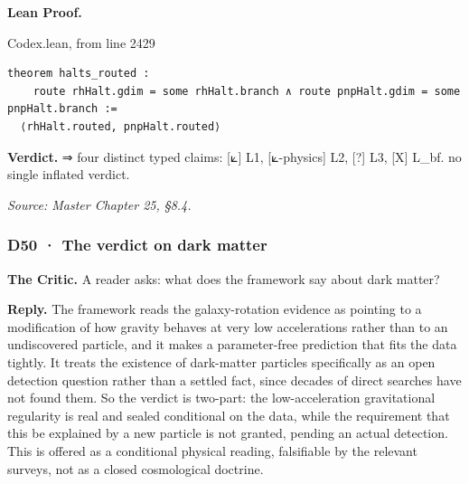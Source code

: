 \documentclass[10pt,twocolumn]{article}
\begin{document}
\textbf{Lean Proof.}

\begin{leanexcerpt}{Codex.lean, from line 2429}
\begin{lstlisting}[style=leanx,firstnumber=2429]
theorem halts_routed :
    route rhHalt.gdim = some rhHalt.branch ∧ route pnpHalt.gdim = some pnpHalt.branch :=
  ⟨rhHalt.routed, pnpHalt.routed⟩
\end{lstlisting}
\end{leanexcerpt}

\textbf{Verdict.} ⇒ four distinct typed claims: {[}⟀{]} L1,
{[}⟀-physics{]} L2, {[}?{]} L3, {[}X{]} L\_bf. no single inflated
verdict.

\emph{Source: Master Chapter 25, §8.4.}

\hypertarget{d50-the-verdict-on-dark-matter}{%
\subsubsection{D50 · The verdict on dark
matter}\label{d50-the-verdict-on-dark-matter}}

\textbf{The Critic.} A reader asks: what does the framework say about
dark matter?

\textbf{Reply.} The framework reads the galaxy-rotation evidence as
pointing to a modification of how gravity behaves at very low
accelerations rather than to an undiscovered particle, and it makes a
parameter-free prediction that fits the data tightly. It treats the
existence of dark-matter particles specifically as an open detection
question rather than a settled fact, since decades of direct searches
have not found them. So the verdict is two-part: the low-acceleration
gravitational regularity is real and sealed conditional on the data,
while the requirement that this be explained by a new particle is not
granted, pending an actual detection. This is offered as a conditional
physical reading, falsifiable by the relevant surveys, not as a closed
cosmological doctrine.
\end{document}

